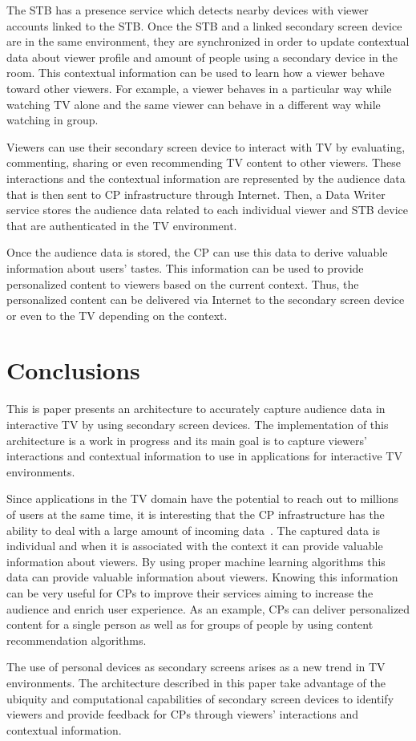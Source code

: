 \documentclass[conference,a4paper]{IEEEtran}
\begin{document}
The STB has a presence service which detects nearby devices with viewer accounts linked to the STB. Once the STB and a linked secondary screen device are in the same environment, they are synchronized in order to update contextual data about viewer profile and amount of people using a secondary device in the room. This contextual information can be used to learn how a viewer behave toward other viewers. For example, a viewer behaves in a particular way while watching TV alone and the same viewer can behave in a different way while watching in group.

Viewers can use their secondary screen device to interact with TV by evaluating, commenting, sharing or even recommending TV content to other viewers. These interactions and the contextual information are represented by the audience data that is then sent to CP infrastructure through Internet. Then, a Data Writer service stores the audience data related to each individual viewer and STB device that are authenticated in the TV environment.

Once the audience data is stored, the CP can use this data to derive valuable information about users' tastes. This information can be used to provide personalized content to viewers based on the current context. Thus, the personalized content can be delivered via Internet to the secondary screen device or even to the TV depending on the context.

\section{Conclusions}

This is paper presents an architecture to accurately capture audience data in interactive TV by using secondary screen devices. The implementation of this architecture is a work in progress and its main goal is to capture viewers' interactions and contextual information to use in applications for interactive TV environments.

Since applications in the TV domain have the potential to reach out to millions of users at the same time, it is interesting that the CP infrastructure has the ability to deal with a large amount of incoming data~\cite{Lee2010,Kim2012,Shin2009}. The captured data is individual and when it is associated with the context it can provide valuable information about viewers. By using proper machine learning algorithms this data can provide valuable information about viewers. Knowing this information can be very useful for CPs to improve their services aiming to increase the audience and enrich user experience. As an example, CPs can deliver personalized content for a single person as well as for groups of people by using content recommendation algorithms.

The use of personal devices as secondary screens arises as a new trend in TV environments. The architecture described in this paper take advantage of the ubiquity and computational capabilities of secondary screen devices to identify viewers and provide feedback for CPs through viewers' interactions and contextual information. 



\end{document}
